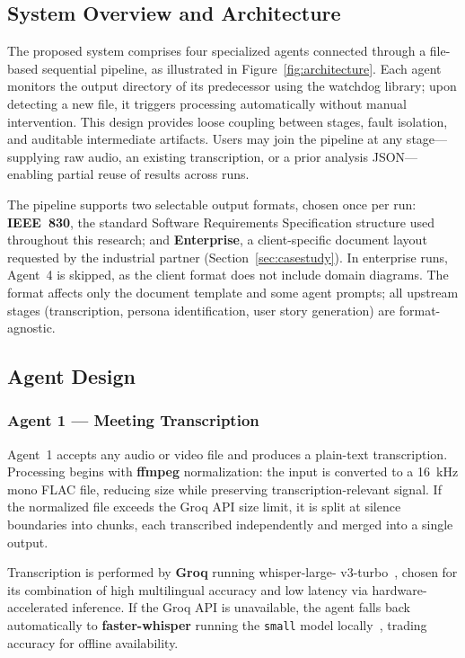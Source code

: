 \documentclass[sigconf]{acmart}
\begin{document}
\subsection{System Overview and Architecture}

The proposed system comprises four specialized agents connected
through a file-based sequential pipeline, as illustrated in
Figure~\ref{fig:architecture}. Each agent monitors the output
directory of its predecessor using the watchdog library; upon
detecting a new file, it triggers processing automatically without
manual intervention. This design provides loose coupling between
stages, fault isolation, and auditable intermediate artifacts. Users
may join the pipeline at any stage—supplying raw audio, an existing
transcription, or a prior analysis JSON—enabling partial reuse of
results across runs.

The pipeline supports two selectable output formats, chosen once per
run: \textbf{IEEE~830}, the standard Software Requirements
Specification structure used throughout this research; and
\textbf{Enterprise}, a client-specific document layout requested by
the industrial partner (Section~\ref{sec:casestudy}). In enterprise
runs, Agent~4 is skipped, as the client format does not include domain
diagrams. The format affects only the document template and some
agent prompts; all upstream stages (transcription, persona
identification, user story generation) are format-agnostic.

\subsection{Agent Design}
\label{sec:agents}

\subsubsection{Agent 1 --- Meeting Transcription}

Agent~1 accepts any audio or video file and produces a plain-text
transcription. Processing begins with \textbf{ffmpeg} normalization:
the input is converted to a 16~kHz mono FLAC file, reducing size
while preserving transcription-relevant signal. If the normalized
file exceeds the Groq API size limit, it is split at silence
boundaries into chunks, each transcribed independently and merged
into a single output.

Transcription is performed by \textbf{Groq} running
{\ttfamily whisper-large- v3-turbo}~\cite{whisper2022,groq2025}, chosen
for its combination of high multilingual accuracy and low latency
via hardware-accelerated inference. If the Groq API is unavailable,
the agent falls back automatically to \textbf{faster-whisper}
running the \texttt{small} model locally~\cite{ctranslate2}, trading
accuracy for offline availability.
\end{document}

